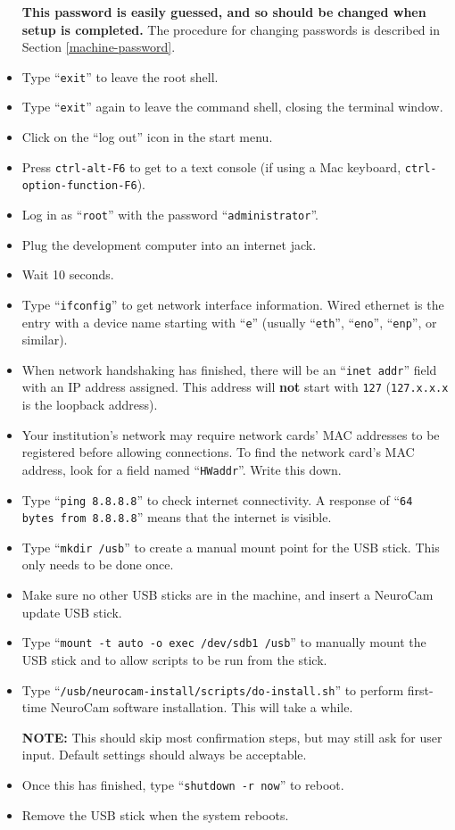\begin{itemize}
\textbf{This password is easily guessed, and so should be changed when
setup is completed.} The procedure for changing passwords is described in
Section \ref{machine-password}.
\item Type ``\verb+exit+'' to leave the root shell.
\item Type ``\verb+exit+'' again to leave the command shell, closing the
terminal window.
\item Click on the ``log out'' icon in the start menu.
%
\item Press \verb+ctrl-alt-F6+ to get to a text console (if using a Mac
keyboard, \verb+ctrl-option-function-F6+).
\item Log in as ``\verb+root+'' with the password ``\verb+administrator+''.
\item Plug the development computer into an internet jack.
\item Wait 10 seconds.
\item Type ``\verb+ifconfig+'' to get network interface information. Wired
ethernet is the entry with a device name starting with ``\verb+e+'' (usually
``\verb+eth+'', ``\verb+eno+'', ``\verb+enp+'', or similar).
\item When network handshaking has finished, there will be an
``\verb+inet addr+'' field with an IP address assigned. This address will
\textbf{not} start with \verb+127+ (\verb+127.x.x.x+ is the loopback address).
\item Your institution's network may require network cards' MAC addresses
to be registered before allowing connections. To find the network card's MAC
address, look for a field named ``\verb+HWaddr+''. Write this down.
\item Type ``\verb+ping 8.8.8.8+'' to check internet connectivity. A response
of ``\verb+64 bytes from 8.8.8.8+'' means that the internet is visible.
\item Type ``\verb+mkdir /usb+'' to create a manual mount point for the USB
stick. This only needs to be done once.
\item Make sure no other USB sticks are in the machine, and insert a
NeuroCam update USB stick.
\item Type ``\verb+mount -t auto -o exec /dev/sdb1 /usb+'' to manually mount
the USB stick and to allow scripts to be run from the stick.
\item Type ``\verb+/usb/neurocam-install/scripts/do-install.sh+'' to perform
first-time NeuroCam software installation. This will take a while.
\par
\textbf{NOTE:} This should skip most confirmation steps, but may still ask for
user input. Default settings should always be acceptable.
\item Once this has finished, type ``\verb+shutdown -r now+'' to reboot.
\item Remove the USB stick when the system reboots.
%
\end{itemize}

